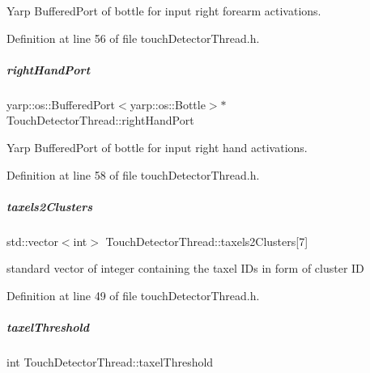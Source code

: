 Yarp Buffered\+Port of bottle for input right forearm activations. 



Definition at line 56 of file touch\+Detector\+Thread.\+h.

\mbox{\label{group__touchDetector_af6585ff213a437baa0b232304f0f9a68}} 
\subparagraph{\texorpdfstring{right\+Hand\+Port}{rightHandPort}}
{\footnotesize\ttfamily yarp\+::os\+::\+Buffered\+Port$<$yarp\+::os\+::\+Bottle$>$$\ast$ Touch\+Detector\+Thread\+::right\+Hand\+Port\hspace{0.3cm}{\ttfamily [protected]}}



Yarp Buffered\+Port of bottle for input right hand activations. 



Definition at line 58 of file touch\+Detector\+Thread.\+h.

\mbox{\label{group__touchDetector_a0e1cb59b32d06c38053bf97c2c11290b}} 
\subparagraph{\texorpdfstring{taxels2\+Clusters}{taxels2Clusters}}
{\footnotesize\ttfamily std\+::vector$<$int$>$ Touch\+Detector\+Thread\+::taxels2\+Clusters\mbox{[}7\mbox{]}\hspace{0.3cm}{\ttfamily [protected]}}



standard vector of integer containing the taxel I\+Ds in form of cluster ID 



Definition at line 49 of file touch\+Detector\+Thread.\+h.

\mbox{\label{group__touchDetector_a2d699150315f222848ecf5e2d2a345f7}} 
\subparagraph{\texorpdfstring{taxel\+Threshold}{taxelThreshold}}
{\footnotesize\ttfamily int Touch\+Detector\+Thread\+::taxel\+Threshold\hspace{0.3cm}{\ttfamily [protected]}}



